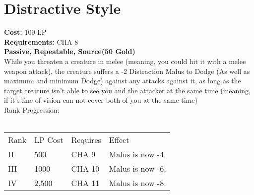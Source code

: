 \section{Distractive Style}\label{perk:distractiveStyle}
\textbf{Cost:} 100 LP\\
\textbf{Requirements:} CHA 8\\
\textbf{Passive, Repeatable, Source(50 Gold)}\\
While you threaten a creature in melee (meaning, you could hit it with a melee weapon attack), the creature suffers a -2 Distraction Malus to Dodge (As well as maximum and minimum Dodge) against any attacks against it, as long as the target creature isn't able to see you and the attacker at the same time (meaning, if it's line of vision can not cover both of you at the same time)\\
Rank Progression:\\
\\
\begin{tabular}{l | l | l | l}
    Rank & LP Cost & Requires & Effect\\
    II & 500 & CHA 9 & Malus is now -4.\\
    III & 1000 & CHA 10 &  Malus is now -6.\\
    IV & 2,500 & CHA 11 &  Malus is now -8.\\
\end{tabular}